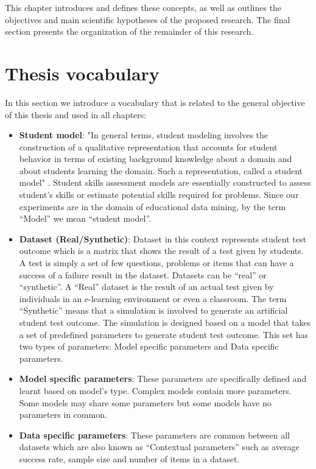 This chapter introduces and defines these concepts, as well as outlines the objectives and main scientific hypotheses of the proposed research. The final section presents the organization of the remainder of this research.

\section{Thesis vocabulary}
\label{Vocabl}

In this section we introduce a vocabulary that is related to the general objective of this thesis and used in all chapters:

\begin{itemize}
\item \textbf{Student model}: "In general terms, student modeling involves the construction of a qualitative representation that accounts for student behavior in terms of existing background knowledge about a domain and about students learning the domain. Such a representation, called a student model" \citep{sison1998student}. Student skills assessment models are essentially constructed to assess student's skills or estimate potential skills required for problems. Since our experiments are in the domain of educational data mining, by the term ``Model'' we mean ``student model''. 
\item \textbf{Dataset (Real/Synthetic)}: Dataset in this context represents student test outcome which is a matrix that shows the result of a test given by students. A test is simply a set of few questions, problems or items that can have a success of a failure result in the dataset. Datasets can be ``real'' or ``synthetic''. A ``Real'' dataset is the result of an actual test given by individuals in an e-learning environment or even a classroom. The term ``Synthetic'' means that a simulation is involved to generate an artificial student test outcome. The simulation is designed based on a model that takes a set of predefined parameters to generate student test outcome. This set has two types of parameters: Model specific parameters and Data specific parameters.
\item \textbf{Model specific parameters}: These parameters are specifically defined and learnt based on model's type. Complex models contain more parameters. Some models may share some parameters but some models have no parameters in common.
\item \textbf{Data specific parameters}: These parameters are common between all datasets which are also known as ``Contextual parameters'' such as average success rate, sample size and number of items in a dataset.

\end{itemize}
